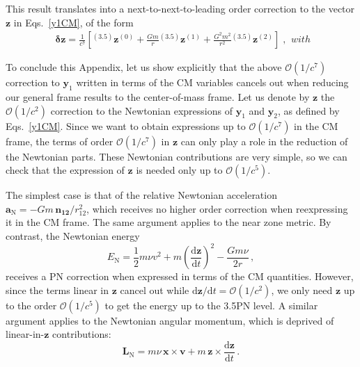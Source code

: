 \documentclass[
superscriptaddress,
preprint,
prd,tightenlines,showpacs,nofootinbib,
eqsecnum,
amsfonts,amsmath,amssymb]{revtex4-1}
\newcommand{\ud}{\mathrm{d}}
\begin{document}
This result translates into a next-to-next-to-leading order correction
to the vector $\mathbf{z}$ in Eqs.~\eqref{y1CM}, of the form
%
\begin{subequations}

\begin{align}
\mathbf{\delta z}=\frac{1}{c^7}\left[{}^{(3.5)}\mathbf{z}^{(0)}+ 
\frac{G m}{r}{}^{(3.5)}\mathbf{z}^{(1)}+
\frac{G^2 m^2}{r^2}{}^{(3.5)}\mathbf{z}^{(2)}\right]\;,
\end{align}
with

\end{subequations}

To conclude this Appendix, let us show explicitly that the above
$\mathcal{O}(1/c^7)$ correction to $\mathbf{y}_1$ written in terms of
the CM variables cancels out when reducing our general frame results
to the center-of-mass frame. Let us denote by $\mathbf{z}$ the
$\mathcal{O}(1/c^2)$ correction to the Newtonian expressions of
$\mathbf{y}_1$ and $\mathbf{y}_2$, as defined by
Eqs.~\eqref{y1CM}. Since we want to obtain expressions up to
$\mathcal{O}(1/c^7)$ in the CM frame, the terms of order
$\mathcal{O}(1/c^7)$ in $\mathbf{z}$ can only play a role in the
reduction of the Newtonian parts. These Newtonian contributions are
very simple, so we can check that the expression of $\mathbf{z}$ is
needed only up to $\mathcal{O}(1/c^5)$.

The simplest case is that of the relative Newtonian acceleration
$\mathbf{a}_\mathrm{N}=-G m \,\mathbf{n_{12}}/r_{12}^2$, which
receives no higher order correction when reexpressing it in the CM
frame. The same argument applies to the near zone metric. By contrast,
the Newtonian energy
%
\begin{equation}
E_\mathrm{N} = \frac{1}{2}m \nu v^2+ 
m \left(\frac{\ud\mathbf{z}}{\ud t}\right)^2-
\frac{G m \nu}{2 r}\,,
\end{equation}
%
%
receives a PN correction when expressed in terms of the CM
quantities. However, since the terms linear in $\mathbf{z}$ cancel out
while $\ud\mathbf{z}/\ud t=\mathcal{O}(1/c^2)$, we only need
$\mathbf{z}$ up to the order $\mathcal{O}(1/c^5)$ to get the energy up
to the 3.5PN level. A similar argument applies to the Newtonian
angular momentum, which is deprived of linear-in-$\mathbf{z}$
contributions:
%
\begin{equation}
\mathbf{L}_\mathrm{N} = m \nu \,\mathbf{x} \times \mathbf{v} + 
m\, \mathbf{z} \times \frac{\ud\mathbf{z}}{\ud t}\,.
\end{equation}
%
\end{document}
